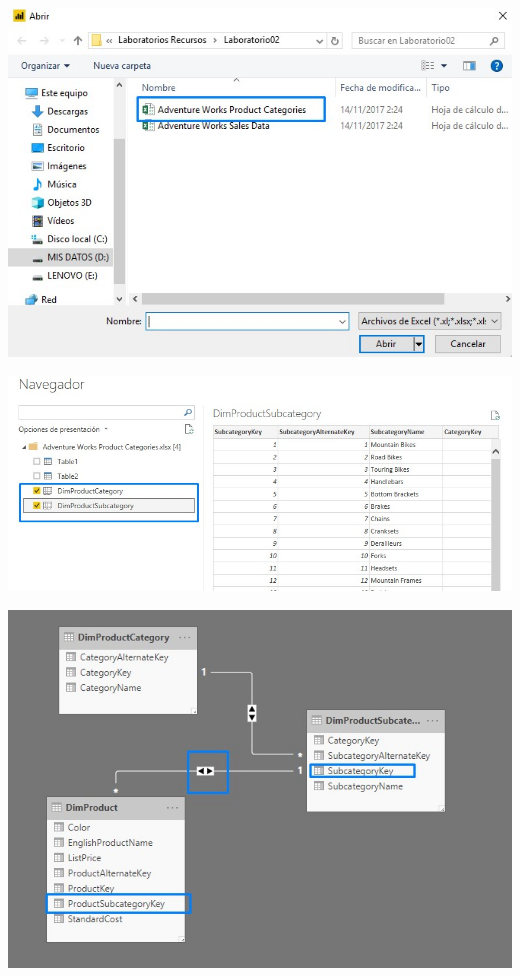 \begin{center}
\includegraphics[width=\columnwidth]{images/task2/task2-01}\newline
\end{center}

\begin{center}
\includegraphics[width=\columnwidth]{images/task2/task2-02}\newline
\end{center}


\begin{center}
\includegraphics[width=\columnwidth]{images/task2/task2-06}\newline
\end{center}